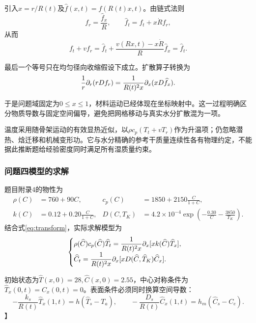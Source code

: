 引入$x=r/R(t)$及$\widehat f(x,t)=f(R(t)x,t)$。由链式法则
\begin{equation}
f_r=\frac{\widehat f_x}{R},\qquad
\widehat f_t=f_t+x\dot R f_r ,
\end{equation}
从而
\begin{equation}
f_t+vf_r=
\widehat f_t+\frac{v(Rx,t)-x\dot R}{R}\widehat f_x
=\widehat f_t .
\end{equation}

最后一个等号只在均匀径向收缩假设下成立。扩散算子转换为
\begin{equation}
\frac1r\partial_r(rDf_r)=
\frac{1}{R(t)^2x}\partial_x(xD\widehat f_x).
\label{eq:transform}
\end{equation}

于是问题域固定为$0\le x\le1$，材料运动已经体现在坐标映射中\cite{huang}。这一过程明确区分物质导数与固定空间偏导，避免把网格移动与真实水分扩散混为一项。

温度采用随骨架运动的有效显热近似，以$\rho c_p(T_t+vT_r)$作为升温项；仍忽略潜热、焓迁移和机械变形功。它与水分精确的参考干质量连续性各有物理约定，不能据此推断题给经验密度同时满足所有湿质量约束。

\subsubsection{问题四模型的求解}
题目附录4的物性为
\begin{equation}
\begin{aligned}
\rho(C)&=760+90C,&c_p(C)&=1850+2150\frac{C}{1+C},\\
k(C)&=0.12+0.20\frac{C}{1+C},&
D(C,T_K)&=4.2\times10^{-4}
\exp\left(-\frac{0.30}{C}-\frac{3850}{T_K}\right).
\end{aligned}
\label{eq:props4}
\end{equation}
结合式\eqref{eq:transform}，实际求解模型为
\begin{equation}
\begin{cases}
\rho(\widehat C)c_p(\widehat C)\widehat T_t
=\dfrac{1}{R(t)^2x}\partial_x[xk(\widehat C)\widehat T_x],\\[5pt]
\widehat C_t
=\dfrac{1}{R(t)^2x}\partial_x[xD(\widehat C,\widehat T_K)\widehat C_x].
\end{cases}
\label{eq:q4}
\end{equation}

初始状态为$\widehat T(x,0)=28,\widehat C(x,0)=2.55$，中心对称条件为$\widehat T_x(0,t)=\widehat C_x(0,t)=0$。表面条件必须同时换算空间导数：
\begin{equation}
-\frac{k_s}{R(t)}\widehat T_x(1,t)
=h(\widehat T_s-T_a),\qquad
-\frac{D_s}{R(t)}\widehat C_x(1,t)
=h_m(\widehat C_s-C_e).
\label{eq:q4bc}
\end{equation}】

